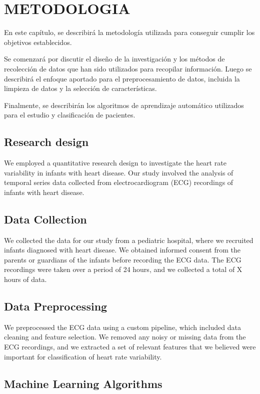 \section{METODOLOGIA}\label{sec:methodology}

En este capítulo, se describirá la metodología utilizada para conseguir cumplir los objetivos establecidos. 

Se comenzará por discutir el diseño de la investigación y los métodos de recolección de datos que han sido utilizados para recopilar información. Luego se describirá el enfoque aportado para el preprocesamiento de datos, incluida la limpieza de datos y la selección de características.

Finalmente, se describirán los algoritmos de aprendizaje automático utilizados para el estudio y clasificación de pacientes. 

\subsection{Research design}

We employed a quantitative research design to investigate the heart rate variability in infants with heart disease. Our study involved the analysis of temporal series data collected from electrocardiogram (ECG) recordings of infants with heart disease.

\subsection{Data Collection}

We collected the data for our study from a pediatric hospital, where we recruited infants diagnosed with heart disease. We obtained informed consent from the parents or guardians of the infants before recording the ECG data. The ECG recordings were taken over a period of 24 hours, and we collected a total of X hours of data.

\subsection{Data Preprocessing}

We preprocessed the ECG data using a custom pipeline, which included data cleaning and feature selection. We removed any noisy or missing data from the ECG recordings, and we extracted a set of relevant features that we believed were important for classification of heart rate variability.

\subsection{Machine Learning Algorithms}

